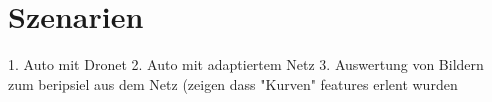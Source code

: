 %
\chapter{Szenarien}


1. Auto mit Dronet 
2. Auto mit adaptiertem Netz
3. Auswertung von Bildern zum beripsiel aus dem Netz (zeigen dass "Kurven" features erlent wurden